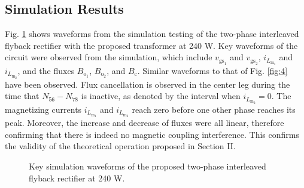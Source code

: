 \documentclass[lettersize,journal]{IEEEtran}
\begin{document}
\subsection{Simulation Results}
Fig. \ref{fig:11} shows waveforms from the simulation testing of the two-phase interleaved flyback rectifier with the proposed transformer at 240 W. Key waveforms of the circuit were observed from the simulation, which include $v_{\mathrm{gs}_1}$ and $v_{\mathrm{gs}_2}$, $i_{L_{\mathrm{m}_1}}$ and $i_{L_{\mathrm{m}_2}}$, and the fluxes $B_{\mathrm{o}_1}$, $B_{\mathrm{o}_2}$, and $B_{\mathrm{c}}$. Similar waveforms to that of Fig. \ref{fig:4} have been observed. Flux cancellation is observed in the center leg during the time that $N_{56}-N_{78}$ is inactive, as denoted by the interval when $i_{L_{\mathrm{m}_2}} = 0$. The magnetizing currents $i_{L_{\mathrm{m}_1}}$ and $i_{L_{\mathrm{m}_2}}$ reach zero before one other phase reaches its peak. Moreover, the increase and decrease of fluxes were all linear, therefore confirming that there is indeed no magnetic coupling interference. This confirms the validity of the theoretical operation proposed in Section II.

\begin{figure}[b!]
    
    \caption{Key simulation waveforms of the proposed two-phase interleaved flyback rectifier at 240 W.}
    \label{fig:11}
\end{figure}
\end{document}
